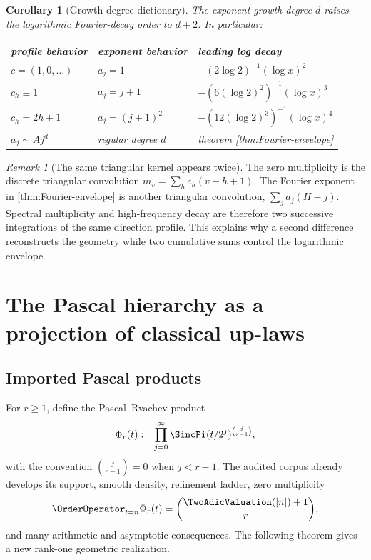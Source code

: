 \documentclass[11pt]{article}
\numberwithin{equation}{section}
\newtheorem{corollary}[theorem]{Corollary}
\theoremstyle{definition}
\theoremstyle{remark}
\newtheorem{remark}[theorem]{Remark}
\begin{document}
\begin{corollary}[Growth-degree dictionary]
\label{cor:growth-dictionary}
The exponent-growth degree $d$ raises the logarithmic Fourier-decay order to
$d+2$.  In particular:
\begin{center}
\begin{tabular}{@{}lll@{}}
\toprule
profile behavior & exponent behavior & leading log decay \\
\midrule
$c=(1,0,\ldots)$ & $a_j=1$ & $-(2\log2)^{-1}(\log x)^2$ \\
$c_h\equiv1$ & $a_j=j+1$ & $-(6(\log2)^2)^{-1}(\log x)^3$ \\
$c_h=2h+1$ & $a_j=(j+1)^2$ & $-(12(\log2)^3)^{-1}(\log x)^4$ \\
$a_j\sim A j^d$ & regular degree $d$ & theorem \ref{thm:Fourier-envelope} \\
\bottomrule
\end{tabular}
\end{center}
\end{corollary}

\begin{remark}[The same triangular kernel appears twice]
The zero multiplicity is the discrete triangular convolution
$m_v=\sum_hc_h(v-h+1)$.  The Fourier exponent in
\cref{thm:Fourier-envelope} is another triangular convolution,
$\sum_ja_j(H-j)$.  Spectral multiplicity and high-frequency decay are therefore
two successive integrations of the same direction profile.  This explains why
a second difference reconstructs the geometry while two cumulative sums
control the logarithmic envelope.
\end{remark}

\section{The Pascal hierarchy as a projection of classical up-laws}
\label{sec:pascal-factorization}

\subsection{Imported Pascal products}

For $r\ge1$, define the Pascal--Rvachev product
\begin{equation}
 \Phi_r(t):=
 \prod_{j=0}^{\infty}\SincPi(t/2^j)^{\binom{j}{r-1}},
 \label{eq:Pascal-product}
\end{equation}
with the convention $\binom{j}{r-1}=0$ when $j<r-1$.  The audited corpus
already develops its support, smooth density, refinement ladder, zero
multiplicity
\begin{equation}
 \OrderOperator_{t=n}\Phi_r(t)=\binom{\TwoAdicValuation(|n|)+1}{r},
 \label{eq:Pascal-zero-imported}
\end{equation}
and many arithmetic and asymptotic consequences.  The following theorem gives
a new rank-one geometric realization.
\end{document}
